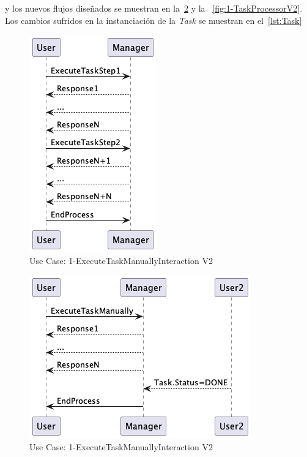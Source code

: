 y los nuevos flujos diseñados se muestran en la~\cref{fig:1-ExecuteTaskManuallyInteractionV2} y la ~\cref{fig:1-TaskProcessorV2}.
Los cambios sufridos en la instanciación de la \textit{Task} se muestran en el~\cref{lst:Task}

\begin{figure}[H]
    \centering
    \includegraphics[height=0.4\textheight]{./part/Ejecucion/Seguimiento/MemoriaExplicativaDeCambios/img/1-ExecuteTaskManuallyInteractionOriginal}
    \caption{Use Case: 1-ExecuteTaskManuallyInteraction V2}\label{fig:1-ExecuteTaskManuallyInteractionOriginal}
\end{figure}
\begin{figure}[H]
    \centering
    \includegraphics[height=0.3\textheight]{./part/Ejecucion/Seguimiento/MemoriaExplicativaDeCambios/img/1-ExecuteTaskManuallyInteraction}
    \caption{Use Case: 1-ExecuteTaskManuallyInteraction V2}\label{fig:1-ExecuteTaskManuallyInteractionV2}
\end{figure}

